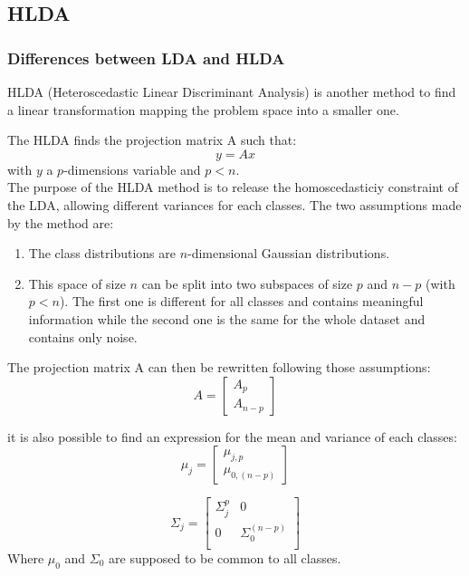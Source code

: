 \subsection{HLDA}

\subsubsection{Differences between LDA and HLDA}

HLDA (Heteroscedastic Linear Discriminant Analysis) is another method to find a linear transformation mapping the problem space into a smaller one.

The HLDA finds the projection matrix A such that:
$$y = Ax$$
with $y$ a $p$-dimensions variable and $p < n$.\\

The purpose of the HLDA method is to release the homoscedasticiy constraint of the LDA, allowing different variances for each classes. The two assumptions made by the method are:

\begin{enumerate}
  \item The class distributions are $n$-dimensional Gaussian distributions.
  \item This space of size $n$ can be split into two subspaces of size $p$
    and $n - p$ (with $p < n$). The first one is different for all classes and contains meaningful information while the second one is the same for the whole dataset and contains only noise.
\end{enumerate}

The projection matrix A can then be rewritten following those assumptions:
$$A = \left [
  \begin{array}{c}
    A_p\\
    A_{n-p}
  \end{array}
\right ]
$$

it is also possible to find an expression for the mean and variance of each classes:
$$\mu_j =
\left [
  \begin{array}{c}
    \mu_{j,p}\\
    \mu_{0,(n-p)}
  \end{array}
\right ]
$$

$$\Sigma_j =
\left [
  \begin{array}{cc}
    \Sigma_j^p & 0\\
    0 & \Sigma_0^{(n-p)}\\
  \end{array}
\right ]
$$
Where $\mu_0$ and $\Sigma_0$ are supposed to be common to all classes.


